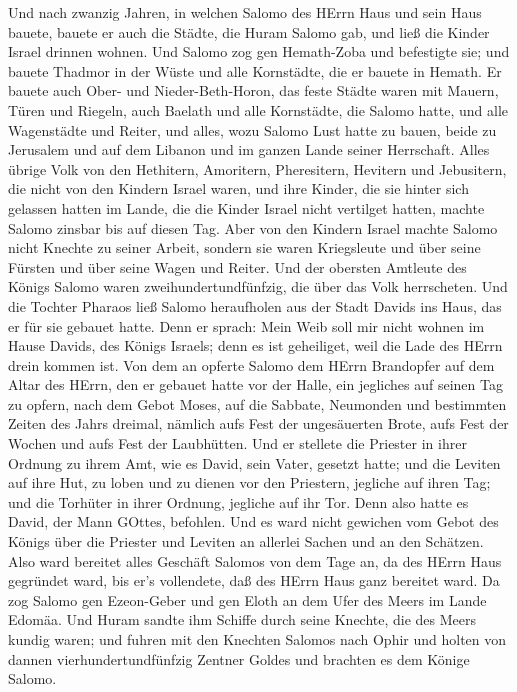  Und nach zwanzig Jahren, in welchen Salomo des HErrn Haus
und sein Haus bauete,  bauete er auch die Städte, die Huram
Salomo gab, und ließ die Kinder Israel drinnen wohnen.  Und
Salomo zog gen Hemath-Zoba und befestigte sie;  und bauete
Thadmor in der Wüste und alle Kornstädte, die er bauete in Hemath.
 Er bauete auch Ober- und Nieder-Beth-Horon, das feste
Städte waren mit Mauern, Türen und Riegeln,  auch Baelath
und alle Kornstädte, die Salomo hatte, und alle Wagenstädte und Reiter,
und alles, wozu Salomo Lust hatte zu bauen, beide zu Jerusalem und auf
dem Libanon und im ganzen Lande seiner Herrschaft.  Alles
übrige Volk von den Hethitern, Amoritern, Pheresitern, Hevitern und
Jebusitern, die nicht von den Kindern Israel waren,  und
ihre Kinder, die sie hinter sich gelassen hatten im Lande, die die
Kinder Israel nicht vertilget hatten, machte Salomo zinsbar bis auf
diesen Tag.  Aber von den Kindern Israel machte Salomo nicht
Knechte zu seiner Arbeit, sondern sie waren Kriegsleute und über seine
Fürsten und über seine Wagen und Reiter.  Und der obersten
Amtleute des Königs Salomo waren zweihundertundfünfzig, die über das
Volk herrscheten.  Und die Tochter Pharaos ließ Salomo
heraufholen aus der Stadt Davids ins Haus, das er für sie gebauet hatte.
Denn er sprach: Mein Weib soll mir nicht wohnen im Hause Davids, des
Königs Israels; denn es ist geheiliget, weil die Lade des HErrn drein
kommen ist.  Von dem an opferte Salomo dem HErrn Brandopfer
auf dem Altar des HErrn, den er gebauet hatte vor der Halle,
 ein jegliches auf seinen Tag zu opfern, nach dem Gebot
Moses, auf die Sabbate, Neumonden und bestimmten Zeiten des Jahrs
dreimal, nämlich aufs Fest der ungesäuerten Brote, aufs Fest der Wochen
und aufs Fest der Laubhütten.  Und er stellete die Priester
in ihrer Ordnung zu ihrem Amt, wie es David, sein Vater, gesetzt hatte;
und die Leviten auf ihre Hut, zu loben und zu dienen vor den Priestern,
jegliche auf ihren Tag; und die Torhüter in ihrer Ordnung, jegliche auf
ihr Tor. Denn also hatte es David, der Mann GOttes, befohlen.
 Und es ward nicht gewichen vom Gebot des Königs über die
Priester und Leviten an allerlei Sachen und an den Schätzen.
 Also ward bereitet alles Geschäft Salomos von dem Tage an,
da des HErrn Haus gegründet ward, bis er's vollendete, daß des HErrn
Haus ganz bereitet ward.  Da zog Salomo gen Ezeon-Geber und
gen Eloth an dem Ufer des Meers im Lande Edomäa.  Und Huram
sandte ihm Schiffe durch seine Knechte, die des Meers kundig waren; und
fuhren mit den Knechten Salomos nach Ophir und holten von dannen
vierhundertundfünfzig Zentner Goldes und brachten es dem Könige Salomo.

